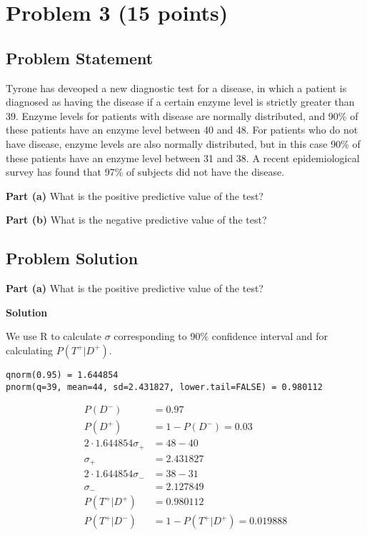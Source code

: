\documentclass[12pt]{article}
\theoremstyle{definition}
\begin{document}
\newpage
\section*{Problem 3 (15 points)}

\subsection*{Problem Statement}

Tyrone has deveoped a new diagnostic test for a disease, in which a patient is diagnosed as having the disease if a certain enzyme level is strictly greater than 39. Enzyme levels for patients with disease are normally distributed, and 90\% of these patients have an enzyme level between 40 and 48. For patients who do not have disease, enzyme levels are also normally distributed, but in this case 90\% of these patients have an enzyme level between 31 and 38. A recent epidemiological survey has found that 97\% of subjects did not have the disease.

\bigskip
\noindent
{\bf Part (a)} What is the positive predictive value of the test?

\bigskip
\noindent
{\bf Part (b)} What is the negative predictive value of the test?



\subsection*{Problem Solution}

\noindent
{\bf Part (a)} What is the positive predictive value of the test?

\bigskip
\noindent
{\bf Solution}

We use R to calculate $\sigma$ corresponding to 90\% confidence interval and for calculating $P(T^+|D^+)$.
\begin{verbatim}
qnorm(0.95) = 1.644854
pnorm(q=39, mean=44, sd=2.431827, lower.tail=FALSE) = 0.980112
\end{verbatim} 
\begin{align*}
P(D^-) &= 0.97\\
P(D^+) &= 1 - P(D^-) = 0.03\\
2\cdot 1.644854\sigma_+ &= 48 - 40\\
\sigma_+ &= 2.431827\\
2\cdot 1.644854\sigma_- &= 38 - 31\\
\sigma_- &= 2.127849\\
P(T^+|D^+) &= 0.980112\\
P(T^+|D^-) &= 1 - P(T^+|D^+) = 0.019888\\
\end{align*}
\newpage
\end{document}
